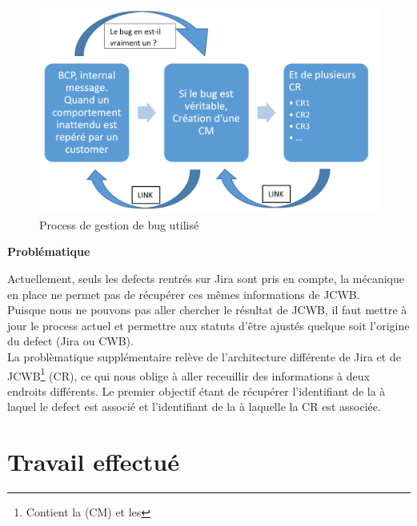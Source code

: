 \begin{figure}[h]
  \centering
      \includegraphics[width=\textwidth]{images/bugManagementProcess.png}
  \caption{Process de gestion de bug utilisé}
	\label{figure:bugManagementProcess}
\end{figure}




\textbf{Probl\'{e}matique}\hfill \\ \indent

Actuellement, seuls les defects rentrés sur Jira sont pris en compte, la mécanique en place ne permet pas de récupérer ces mêmes informations de JCWB. \\
Puisque nous ne pouvons pas aller chercher le résultat de JCWB, il faut mettre à jour le process actuel et permettre aux statuts d'être ajustés quelque soit l'origine du defect (Jira ou CWB).\\
La problèmatique supplémentaire relève de l'architecture différente de Jira et de JCWB\footnote{Contient la  (CM) et les } (CR), ce qui nous oblige à aller receuillir des informations à deux endroits différents. Le premier objectif étant de récupérer l'identifiant de la  à laquel le defect est associé et l'identifiant de la  à laquelle la CR est associée.\\






\section{Travail effectu\'{e}}


